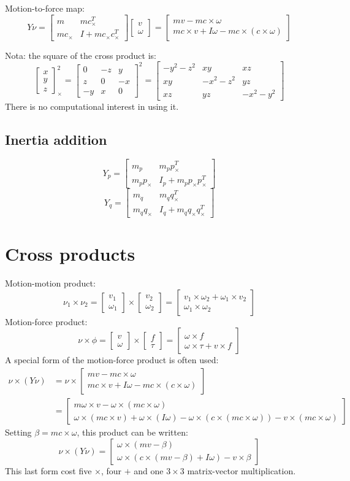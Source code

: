 \documentclass[11pt,twoside,a4paper]{article}
\newcommand{\BIN}{\begin{bmatrix}}
\newcommand{\BOUT}{\end{bmatrix}}
\begin{document}
Motion-to-force map:
$$ Y \nu = \BIN m & mc_\times^T \\ mc_\times & I+mc_\times c_\times^T \BOUT \BIN v \\ \omega \BOUT
 = \BIN m v - mc \times \omega \\ mc \times v + I \omega - mc \times ( c\times \omega) \BOUT$$

Nota: the square of the cross product is:
$$\BIN x\\y\\z\BOUT_ \times^2 = \BIN 0&-z&y \\ z&0&-x \\ -y&x&0 \BOUT^2 = \BIN -y^2-z^2&xy&xz \\ xy&-x^2-z^2&yz \\ xz&yz&-x^2-y^2 \BOUT$$
There is no computational interest in using it.

\subsection{Inertia addition}

$$ Y_p = \BIN m_p &  m_p  p_\times^T \\ m_p p_\times &  I_p + m_p  p_\times p_\times^T \BOUT$$
$$ Y_q = \BIN m_q &  m_q  q_\times^T \\ m_q q_\times &  I_q + m_q  q_\times q_\times^T \BOUT$$




\section{Cross products}

Motion-motion product:
$$\nu_1 \times \nu_2 = \BIN v_1\\\omega_1\BOUT \times \BIN v_2\\\omega_2\BOUT = \BIN  v_1 \times \omega_2 + \omega_1 \times v_2 \\ \omega_1 \times \omega_2 \BOUT $$
Motion-force product:
$$\nu \times \phi =  \BIN v\\\omega\BOUT \times \BIN f\\ \tau \BOUT = \BIN  \omega \times f \\ \omega \times \tau + v \times f \BOUT $$
A special form of the motion-force product is often used:
\begin{align*}\nu \times (Y \nu) &= \nu \times \BIN mv - mc\times \omega \\ mc\times v + I \omega - mc\times(c\times \omega) \BOUT \\&= \BIN m \omega\times v - \omega\times(mc\times \omega) \\ \omega \times ( mc \times v) + \omega \times (I\omega) -\omega \times(c \times( mc\times \omega)) -v\times(mc \times \omega)\BOUT\end{align*}
Setting $\beta=mc \times \omega$, this product can be written:
$$\nu \times (Y \nu) = \BIN \omega \times (m v - \beta) \\ \omega \times( c \times (mv-\beta)+I\omega) - v \times \beta \BOUT$$
This last form cost five $\times$, four $+$ and one $3\times3$ matrix-vector multiplication.
\end{document}
